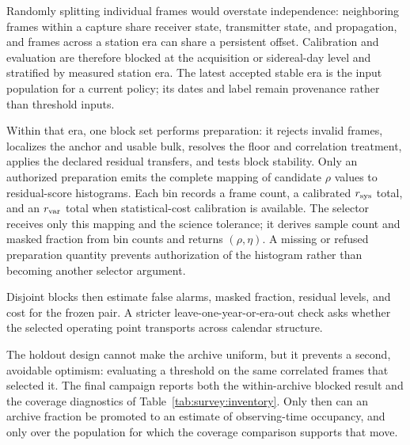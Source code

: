 Randomly splitting individual frames would overstate independence: neighboring
frames within a capture share receiver state, transmitter state, and propagation,
and frames across a station era can share a persistent offset.  Calibration and
evaluation are therefore blocked at the acquisition or sidereal-day level and
stratified by measured station era.  The latest accepted stable era is the input
population for a current policy; its dates and label remain provenance rather
than threshold inputs.

Within that era, one block set performs preparation: it rejects invalid frames,
localizes the anchor and usable bulk, resolves the floor and correlation treatment,
applies the declared residual transfers, and tests block stability.  Only an
authorized preparation emits the complete mapping of candidate $\rho$ values to
residual-score histograms.  Each bin records a frame count, a calibrated
$r_{\rm sys}$ total, and an $r_{\rm var}$ total when statistical-cost calibration
is available.  The selector receives only this mapping and the science tolerance;
it derives sample count and masked fraction from bin counts and returns
$(\rho,\eta)$.  A missing or refused preparation quantity prevents authorization
of the histogram rather than becoming another selector argument.

Disjoint blocks then estimate false alarms, masked fraction, residual levels, and
cost for the frozen pair.  A stricter leave-one-year-or-era-out check asks whether
the selected operating point transports across calendar structure.

The holdout design cannot make the archive uniform, but it prevents a second,
avoidable optimism: evaluating a threshold on the same correlated frames that
selected it.  The final campaign reports both the within-archive blocked result
and the coverage diagnostics of Table~\ref{tab:survey:inventory}.  Only then can
an archive fraction be promoted to an estimate of observing-time occupancy, and
only over the population for which the coverage comparison supports that move.
